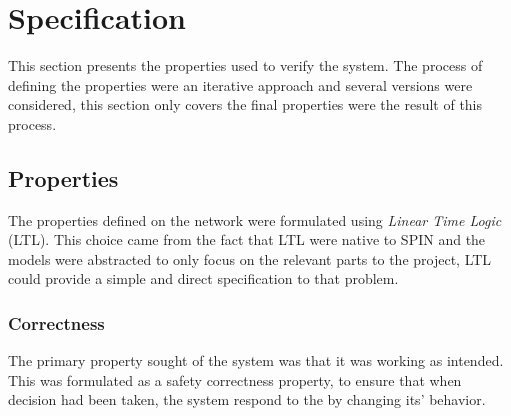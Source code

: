 



\section{Specification}

This section presents the properties used to verify the system. The process of defining the properties were an iterative approach and several versions were considered, this section only covers the final properties were the result of this process. 

\subsection{Properties}

The properties defined on the network were formulated using \textit{Linear Time Logic} (LTL). This choice came from the fact that LTL were native to SPIN and the models were abstracted to only focus on the relevant parts to the project, LTL could provide a simple and direct specification to that problem.

\subsubsection{Correctness}

The primary property sought of the system was that it was working as intended. This was formulated as a safety correctness property, to ensure that when decision had been taken, the system respond to the by changing its' behavior.

